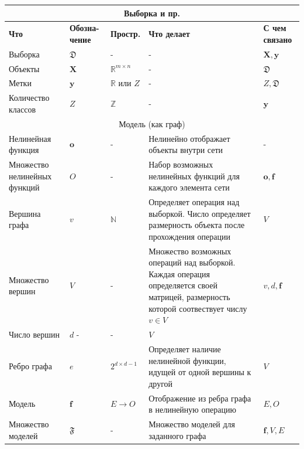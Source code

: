 \documentclass[12pt]{article}
\begin{document}
\begin{table}[tbh!]
\small
\begin{tabularx}{\textwidth}{|X|p{1.5cm}|p{1.5cm}|X|p{1.5cm}|}
\hline
\multicolumn{5}{c}{Выборка и пр.}\\\hline
\bf Что & \bf Обозна- чение & \bf Простр. & \bf Что делает & \bf С чем связано  \\ \hline \hline

  Выборка & $\mathfrak{D}$ & - & - & $\mathbf{X}, \mathbf{y}$ \\ \hline
  Объекты & $\mathbf{X}$  &  $\mathbb{R}^{m \times n}$ & - & $\mathfrak{D}$   \\ \hline
  Метки & $\mathbf{y}$  &  $\mathbb{R}$ или $Z$ & - & $Z, \mathfrak{D}$   \\ \hline
  Количество классов & $Z$ & $\mathbb{Z}$ & - & $\mathbf{y}$ \\ \hline
\multicolumn{5}{c}{Модель (как граф)}\\\hline
  Нелинейная функция & $\mathbf{o}$ & - & Нелинейно отображает объекты внутри сети & - \\ \hline
  Множество нелинейных функций & $O$ & - & Набор возможных нелинейных функций для каждого элемента сети & $\mathbf{o}, \mathbf{f}$ \\ \hline
  Вершина графа & $v$ & $\mathbb{N}$ & Определяет операция над выборкой. Число определяет размерность объекта после прохождения операции & $V$ \\ \hline
  Множество вершин & $V$ & - & Множество возможных операций над выборкой. Каждая операция определяется своей матрицей, размерность которой соотвествует числу $v \in V$ & $v, d, \mathbf{f}$ \\ \hline
  Число вершин & $d$ - & - & $V$ \\ \hline
  Ребро графа & $e$ & $2^{d \times {d-1}}$ & Определяет наличие нелинейной функции, идущей от одной вершины к другой & $V$ \\ \hline
  Модель & $\mathbf{f}$ & $E \to O$ & Отображение из ребра графа в нелинейную операцию & $E, O$ \\ \hline
  Множество моделей & $\mathfrak{F}$ & - & Множество моделей для заданного графа & $\mathbf{f}, V, E$ \\ \hline
  
\end{tabularx}
\end{table}
\end{document}
